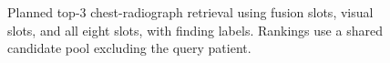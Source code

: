 \begin{figure}[tbp]
    \centering
    \caption{Planned top-3 chest-radiograph retrieval using fusion slots, visual slots, and all eight slots, with finding labels. Rankings use a shared candidate pool excluding the query patient.}
    \label{fig:candidate_state_retrieval}
\end{figure}
